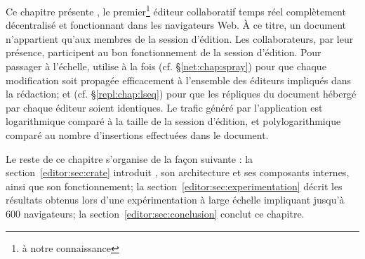 



Ce chapitre présente \CRATE, le premier\footnote{à notre connaissance} éditeur
collaboratif temps réel complètement décentralisé et fonctionnant dans les
navigateurs Web. À ce titre, un document n'appartient qu'aux membres de la
session d'édition. Les collaborateurs, par leur présence, participent au bon
fonctionnement de la session d'édition. Pour passager à l'échelle, \CRATE
utilise à la fois \SPRAY (cf. §\ref{net:chap:spray}) pour que chaque
modification soit propagée efficacement à l'ensemble des éditeurs impliqués dans
la rédaction; et \LSEQ (cf. §\ref{repl:chap:lseq}) pour que les répliques du
document hébergé par chaque éditeur soient identiques. Le trafic généré par
l'application est logarithmique comparé à la taille de la session d'édition, et
polylogarithmique comparé au nombre d'insertions effectuées dans le document.

Le reste de ce chapitre s'organise de la façon suivante : 
la section~\ref{editor:sec:crate} introduit \CRATE, son architecture et ses
composants internes, ainsi que son fonctionnement; la
section~\ref{editor:sec:experimentation} décrit les résultats obtenus lors d'une
expérimentation à large échelle impliquant jusqu'à 600 navigateurs; la
section~\ref{editor:sec:conclusion} conclut ce chapitre.


